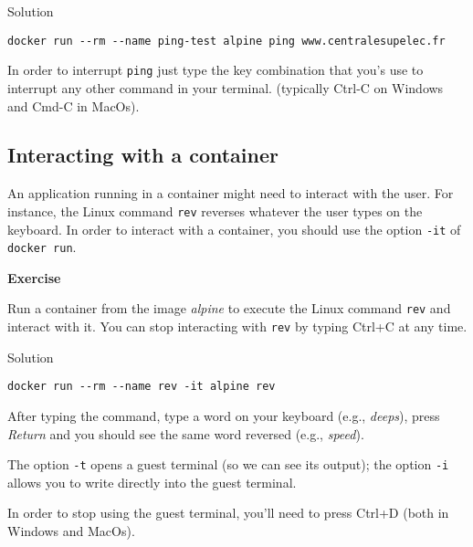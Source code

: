 \documentclass[
]{article}
\newenvironment{infobox}[1]
  {
  \begin{itemize}
  \renewcommand{\labelitemi}{
    \raisebox{-.7\height}[0pt][0pt]{
      
    }
  }
  \setlength{\fboxsep}{1em}
  \begin{whitebox}
  \item
  }
  {
  \end{whitebox}
  \end{itemize}
  }
\theoremstyle{definition}
\theoremstyle{definition}
\theoremstyle{definition}
\theoremstyle{remark}
\let\BeginKnitrBlock\begin \let\EndKnitrBlock\end
\begin{document}
Solution

\begin{infobox}{exercisebox}

\begin{verbatim}
docker run --rm --name ping-test alpine ping www.centralesupelec.fr
\end{verbatim}

In order to interrupt \texttt{ping}
just type the key combination that you's use to
interrupt any other command in your terminal.
(typically Ctrl-C on Windows and Cmd-C in MacOs).

\end{infobox}

\hypertarget{interacting-with-a-container}{%
\subsection{Interacting with a container}\label{interacting-with-a-container}}

An application running in a container might need to interact
with the user.
For instance, the Linux
command \texttt{rev} reverses whatever
the user types on the keyboard.
In order to interact with a container, you should use the option
\texttt{-it} of \texttt{docker\ run}.

\begin{infobox}{exercisebox}

\textbf{Exercise}

\BeginKnitrBlock{exercise}
\protect\hypertarget{exr:unnamed-chunk-8}{}{\label{exr:unnamed-chunk-8} }Run a container from the image \emph{alpine} to execute the
Linux command \texttt{rev} and interact with it.
You can stop interacting with \texttt{rev} by typing Ctrl+C at any time.
\EndKnitrBlock{exercise}

\end{infobox}

Solution

\begin{infobox}{exercisebox}

\begin{verbatim}
docker run --rm --name rev -it alpine rev
\end{verbatim}

After typing the command, type a word on your keyboard
(e.g., \emph{deeps}), press \emph{Return} and
you should see the same word reversed (e.g., \emph{speed}).

The option \texttt{-t} opens a guest terminal (so we can see its
output); the option \texttt{-i} allows you to write directly
into the guest terminal.

In order to stop using the guest terminal,
you'll need to press Ctrl+D (both in Windows and MacOs).

\end{infobox}
\end{document}

